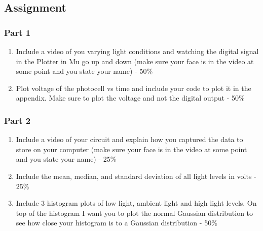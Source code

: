 \subsection{Assignment}


        
\subsubsection{Part 1}
\begin{enumerate}[itemsep=-5pt]
\item Include a video of you varying light conditions and watching the digital signal in the Plotter in Mu go up and down (make sure your face is in the video at some point and you state your name) - 50\%
\item Plot voltage of the photocell vs time and include your code to plot it in the appendix. Make sure to plot the
voltage and not the digital output - 50\%
\end{enumerate}

\subsubsection{Part 2}
\begin{enumerate}[itemsep=-5pt]
\item Include a video of your circuit and explain how you captured the data to store on your computer (make sure your face is in the video at some point and you state your name) - 25\%
\item Include the mean, median, and standard deviation of all light levels in volts - 25\%
\item Include 3 histogram plots of low light, ambient light and high light levels. On top of the histogram I want you to plot the normal Gaussian distribution to see how close your histogram is to a Gaussian distribution  - 50\%
\end{enumerate}

